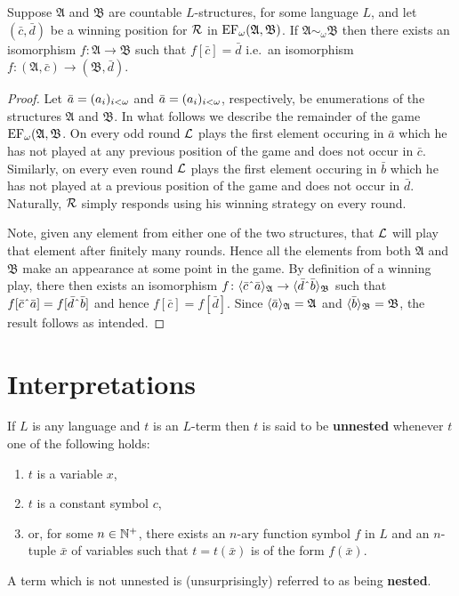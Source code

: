 \begin{prp}\label{prp:bfiso}
	Suppose $\mathfrak{A}$ and $\mathfrak{B}$ are countable $L$-structures, for some language $L$, and let $(\bar{c},\bar{d})$ be a winning position for $\mathcal{R}$ in $\operatorname{EF}_\omega(\mathfrak{A},\mathfrak{B})$.  If $\mathfrak{A}\sim_\omega\mathfrak{B}$ then there exists an isomorphism $f\colon\mathfrak{A}\to\mathfrak{B}$ such that $f[\bar{c}]=\bar{d}$ i.e.\ an isomorphism $f\colon(\mathfrak{A},\bar{c})\to(\mathfrak{B},\bar{d})$.
\end{prp}
\begin{proof}
	Let $\bar{a}=(a_i)_{i<\omega}$ and $\bar{a}=(a_i)_{i<\omega}$, respectively, be enumerations of the structures $\mathfrak{A}$ and $\mathfrak{B}$.  In what follows we describe the remainder of the game $\operatorname{EF}_\omega(\mathfrak{A},\mathfrak{B}$.  On every odd round $\mathcal{L}$ plays the first element occuring in $\bar{a}$ which he has not played at any previous position of the game and does not occur in $\bar{c}$.  Similarly, on every even round $\mathcal{L}$ plays the first element occuring in $\bar{b}$ which he has not played at a previous position of the game and does not occur in $\bar{d}$.  Naturally, $\mathcal{R}$ simply responds using his winning strategy on every round.

	Note, given any element from either one of the two structures, that $\mathcal{L}$ will play that element after finitely many rounds.  Hence all the elements from both $\mathfrak{A}$ and $\mathfrak{B}$ make an appearance at some point in the game.  By definition of a winning play, there then exists an isomorphism $f\colon\gen{\bar{c}\string^\bar{a}}{\mathfrak{A}}\to\gen{\bar{d}\string^\bar{b}}{\mathfrak{B}}$ such that $f[\bar{c}\string^\bar{a}]=f[\bar{d}\string^\bar{b}]$ and hence $f[\bar{c}]=f[\bar{d}]$.  Since $\langle \bar{a}\rangle_{\mathfrak{A}}=\mathfrak{A}$ and $\langle \bar{b}\rangle_{\mathfrak{B}}=\mathfrak{B}$, the result follows as intended.
\end{proof}


\section{Interpretations}

\begin{dfn}
	If $L$ is any language and $t$ is an $L$-term then $t$ is said to be \textbf{unnested} whenever $t$ one of the following holds:
	\begin{enumerate}
		\item	$t$ is a variable $x$,
		\item	$t$ is a constant symbol $c$,
		\item	or, for some $n\in\mathbb{N}^{+}$, there exists an $n$-ary function symbol $f$ in $L$ and an $n$-tuple $\bar{x}$ of variables such that $t=t(\bar{x})$ is of the form $f(\bar{x})$.
	\end{enumerate}
	A term which is not unnested is (unsurprisingly) referred to as being \textbf{nested}.
\end{dfn}

